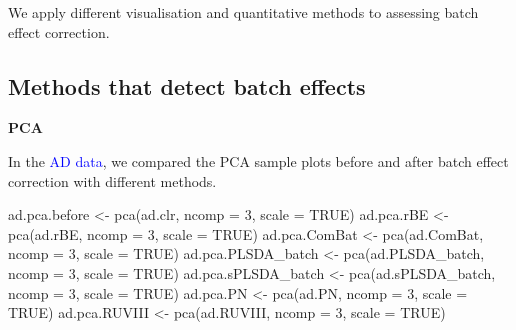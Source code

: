 \documentclass[
]{book}
\newenvironment{Shaded}{\begin{snugshade}}{\end{snugshade}}
\newcommand{\AttributeTok}[1]{\textcolor[rgb]{0.77,0.63,0.00}{#1}}
\newcommand{\ConstantTok}[1]{\textcolor[rgb]{0.00,0.00,0.00}{#1}}
\newcommand{\DecValTok}[1]{\textcolor[rgb]{0.00,0.00,0.81}{#1}}
\newcommand{\FunctionTok}[1]{\textcolor[rgb]{0.00,0.00,0.00}{#1}}
\newcommand{\NormalTok}[1]{#1}
\newcommand{\OtherTok}[1]{\textcolor[rgb]{0.56,0.35,0.01}{#1}}
\begin{document}
We apply different visualisation and quantitative methods to assessing batch effect correction.

\hypertarget{methods-that-detect-batch-effects}{%
\subsection{Methods that detect batch effects}\label{methods-that-detect-batch-effects}}

\textbf{PCA}

In the \textcolor{blue}{AD data}, we compared the PCA sample plots before and after batch effect correction with different methods.

\begin{Shaded}
\begin{Highlighting}[]
\NormalTok{ad.pca.before }\OtherTok{\textless{}{-}} \FunctionTok{pca}\NormalTok{(ad.clr, }\AttributeTok{ncomp =} \DecValTok{3}\NormalTok{, }\AttributeTok{scale =} \ConstantTok{TRUE}\NormalTok{)}
\NormalTok{ad.pca.rBE }\OtherTok{\textless{}{-}} \FunctionTok{pca}\NormalTok{(ad.rBE, }\AttributeTok{ncomp =} \DecValTok{3}\NormalTok{, }\AttributeTok{scale =} \ConstantTok{TRUE}\NormalTok{)}
\NormalTok{ad.pca.ComBat }\OtherTok{\textless{}{-}} \FunctionTok{pca}\NormalTok{(ad.ComBat, }\AttributeTok{ncomp =} \DecValTok{3}\NormalTok{, }\AttributeTok{scale =} \ConstantTok{TRUE}\NormalTok{)}
\NormalTok{ad.pca.PLSDA\_batch }\OtherTok{\textless{}{-}} \FunctionTok{pca}\NormalTok{(ad.PLSDA\_batch, }\AttributeTok{ncomp =} \DecValTok{3}\NormalTok{, }\AttributeTok{scale =} \ConstantTok{TRUE}\NormalTok{)}
\NormalTok{ad.pca.sPLSDA\_batch }\OtherTok{\textless{}{-}} \FunctionTok{pca}\NormalTok{(ad.sPLSDA\_batch, }\AttributeTok{ncomp =} \DecValTok{3}\NormalTok{, }\AttributeTok{scale =} \ConstantTok{TRUE}\NormalTok{)}
\NormalTok{ad.pca.PN }\OtherTok{\textless{}{-}} \FunctionTok{pca}\NormalTok{(ad.PN, }\AttributeTok{ncomp =} \DecValTok{3}\NormalTok{, }\AttributeTok{scale =} \ConstantTok{TRUE}\NormalTok{)}
\NormalTok{ad.pca.RUVIII }\OtherTok{\textless{}{-}} \FunctionTok{pca}\NormalTok{(ad.RUVIII, }\AttributeTok{ncomp =} \DecValTok{3}\NormalTok{, }\AttributeTok{scale =} \ConstantTok{TRUE}\NormalTok{)}
\end{Highlighting}
\end{Shaded}
\end{document}
